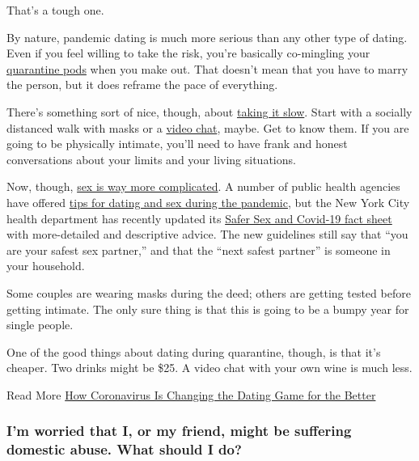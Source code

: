 That's a tough one.

By nature, pandemic dating is much more serious than any other type of
dating. Even if you feel willing to take the risk, you're basically
co-mingling your
\href{https://www.nytimes3xbfgragh.onion/2020/06/09/parenting/coronavirus-pod-family.html}{quarantine
pods} when you make out. That doesn't mean that you have to marry the
person, but it does reframe the pace of everything.

There's something sort of nice, though, about
\href{https://www.nytimes3xbfgragh.onion/2020/05/21/style/first-date-during-quarantine-coronavirus.html}{taking
it slow}. Start with a socially distanced walk with masks or a
\href{https://www.nytimes3xbfgragh.onion/2020/04/18/nyregion/coronavirus-dating-video.html}{video
chat}, maybe. Get to know them. If you are going to be physically
intimate, you'll need to have frank and honest conversations about your
limits and your living situations.

Now, though,
\href{https://www.nytimes3xbfgragh.onion/2020/06/11/well/live/coronavirus-sex-dating-masks.html}{sex
is way more complicated}. A number of public health agencies have
offered
\href{https://www.nytimes3xbfgragh.onion/2020/05/20/world/netherlands-sex-buddies-coronavirus.html}{tips
for dating and sex during the pandemic}, but the New York City health
department has recently updated its
\href{https://www1.nyc.gov/assets/doh/downloads/pdf/imm/covid-sex-guidance.pdf}{Safer
Sex and Covid-19 fact sheet} with more-detailed and descriptive advice.
The new guidelines still say that ``you are your safest sex partner,''
and that the ``next safest partner'' is someone in your household.

Some couples are wearing masks during the deed; others are getting
tested before getting intimate. The only sure thing is that this is
going to be a bumpy year for single people.

One of the good things about dating during quarantine, though, is that
it's cheaper. Two drinks might be \$25. A video chat with your own wine
is much less.

 Read More
\href{https://www.nytimes3xbfgragh.onion/2020/05/07/well/mind/dating-coronavirus-love-relationships.html}{How
Coronavirus Is Changing the Dating Game for the Better}

\hypertarget{im-worried-that-i-or-my-friend-might-be-suffering-domestic-abuse-what-should-i-do}{%
\subsubsection{I'm worried that I, or my friend, might be suffering
domestic abuse. What should I
do?}\label{im-worried-that-i-or-my-friend-might-be-suffering-domestic-abuse-what-should-i-do}}

